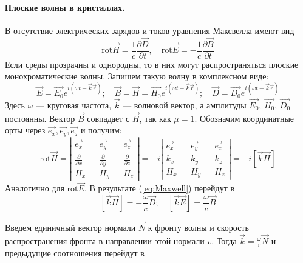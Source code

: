 \documentclass[a4paper, 12pt]{article}
\begin{document}
	\paragraph{Плоские волны в кристаллах.}
	В отсутствие электрических зарядов и токов уравнения Максвелла имеют вид
	\begin{equation}
		\mathrm{rot}\vec{H}=\frac{1}{c}\frac{\partial\vec{D}}{\partial t},\quad \mathrm{rot}\vec{E}=-\frac{1}{c}\frac{\partial\vec{B}}{\partial t}
		\label{eq:Maxwell}
	\end{equation}
	Если среды прозрачны и однородны, то в них могут распространяться плоские монохроматические волны. Запишем такую волну в комплексном виде:
	\begin{equation}
		\vec{E}=\vec{E_0}e^{i\left(\omega t-\vec{k}\vec{r}\right)};\quad \vec{B}=\vec{H}=\vec{H_0}e^{i\left(\omega t-\vec{k}\vec{r}\right)};\quad \vec{D}=\vec{D_0}e^{i\left(\omega t-\vec{k}\vec{r}\right)}
	\end{equation}
	Здесь $\omega$ — круговая частота, $\vec{k}$ — волновой вектор, а амплитуды $\vec{E_0}$, $\vec{H_0}$, $\vec{D_0}$ постоянны. Вектор $\vec{B}$ совпадает с $\vec{H}$, так как $\mu=1$. Обозначим координатные орты через $\vec{e_x},\vec{e_y},\vec{e_z}$ и получим:
	\begin{equation}
		\mathrm{rot}\vec{H}=\left|
		\begin{matrix}
			\vec{e_x} && \vec{e_y} && \vec{e_z}\\
			\frac{\partial}{\partial x} && \frac{\partial}{\partial y} && \frac{\partial}{\partial z}\\
			H_x && H_y && H_z
		\end{matrix}
		\right|=
		-i\left|
		\begin{matrix}
			\vec{e_x} && \vec{e_y} && \vec{e_z}\\
			k_x && k_y && k_z\\
			H_x && H_y && H_z
		\end{matrix}
		\right|=
		-i\left[\vec{k}\vec{H}\right]
	\end{equation}
	Аналогично для $\mathrm{rot}\vec{E}$. В результате (\ref{eq:Maxwell}) перейдут в 
	\begin{equation}
		\left[\vec{k}\vec{H}\right]=-\frac{\omega}{c}\vec{D};\quad\left[\vec{k}\vec{E}\right]=\frac{\omega}{c}\vec{B}
	\end{equation}\par
	Введем единичный вектор нормали $\vec{N}$ к фронту волны и скорость распространения фронта в направлении этой нормали $v$. Тогда $\vec{k}=\frac{\omega}{v}\vec{N}$ и предыдущие соотношения перейдут в
\end{document}
